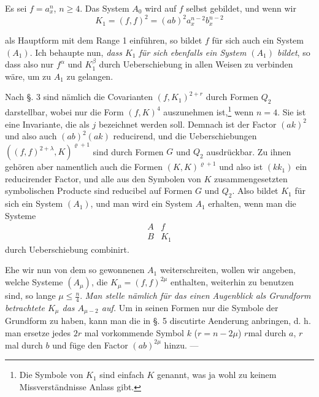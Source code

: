 \documentclass[10pt]{article}
\begin{document}
Es sei $f=a_x^n$, $n\geq4$. Das System $A_0$ wird auf $f$ selbst gebildet, und wenn wir
\[
K_1=(f,f)^2=(ab)^2a_x^{n-2}b_x^{n-2}
\]



als Hauptform mit dem Range 1 einführen, so bildet $f$ für sich auch ein System $(A_1)$. Ich behaupte nun, \textit{dass $K_1$ für sich ebenfalls ein System $(A_1)$ bildet}, so dass also nur $f^\alpha$ und $K_1^\beta$ durch Ueberschiebung in allen Weisen zu verbinden wäre, um zu $A_1$ zu gelangen.

Nach §. 3 sind nämlich die Covarianten $(f,K_1)^{2+r}$ durch Formen $Q_2$ darstellbar, wobei nur die Form $(f,K)^4$ auszunehmen ist,\footnote{Die Symbole von $K_1$ sind einfach $K$ genannt, was ja wohl zu keinem Missverständnisse Anlass gibt.} wenn $n=4$. Sie ist eine Invariante, die als $j$ bezeichnet werden soll. Demnach ist der Factor $(ak)^2$ und also auch $(ab)^2(ak)$ reducirend, und die Ueberschiebungen $((f,f)^{2+\lambda},K)^{\varrho+1}$ sind durch Formen $G$ und $Q_2$ ausdrückbar. Zu ihnen gehören aber namentlich auch die Formen $(K,K)^{\varrho+1}$ und also ist $(kk_1)$ ein reducirender Factor, und alle aus den Symbolen von $K$ zusammengesetzten symbolischen Producte sind reducibel auf Formen $G$ und $Q_2$. Also bildet $K_1$ für sich ein System $(A_1)$, und man wird ein System $A_1$ erhalten, wenn man die Systeme
\[
\begin{array}{cc}
A&f\\
B&K_1
\end{array}
\]
durch Ueberschiebung combinirt.

Ehe wir nun von dem so gewonnenen $A_1$ weiterschreiten, wollen wir angeben, welche Systeme $(A_\mu)$, die $K_\mu=(f,f)^{2\mu}$ enthalten, weiterhin zu benutzen sind, so lange $\mu\leq\frac n4$. \textit{Man stelle nämlich für das einen Augenblick als Grundform betrachtete $K_\mu$ das $A_{\mu-2}$ auf.} Um in seinen Formen nur die Symbole der Grundform zu haben, kann man die in §. 5 discutirte Aenderung anbringen, d. h. man ersetze jedes $2r$ mal vorkommende Symbol $k$ ($r=n-2\mu$) $r$mal durch $a$, $r$mal durch $b$ und füge den Factor $(ab)^{2\mu}$ hinzu. ---
\end{document}
